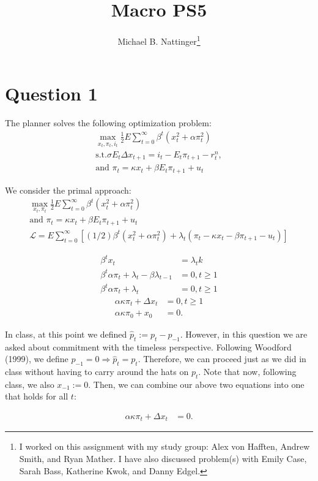 \documentclass[11pt]{article} %
\title{Macro PS5}
\author{Michael B. Nattinger\footnote{I worked on this assignment with my study group: Alex von Hafften, Andrew Smith, and Ryan Mather. I have also discussed problem(s) with Emily Case, Sarah Bass, Katherine Kwok, and Danny Edgel.}}
\begin{document}
\maketitle
\section{Question 1}
The planner solves the following optimization problem:
\begin{align*}
\max_{x_t,\pi_t,i_t} \frac{1}{2}E\sum_{t=0}^{\infty}\beta^t (x_t^2 + \alpha \pi_t^2) \\
\text{s.t.} \sigma E_t\Delta x_{t+1} = i_t - E_t\pi_{t+1} - r_t^n,\\
\text{and } \pi_t = \kappa x_t + \beta E_t\pi_{t+1} + u_t
\end{align*}

We consider the primal approach:
\begin{align*}
\max_{x_t,\pi_t} \frac{1}{2}E\sum_{t=0}^{\infty}\beta^t (x_t^2 + \alpha \pi_t^2) \\
\text{and } \pi_t = \kappa x_t + \beta E_t\pi_{t+1} + u_t\\
\mathcal{L} = E\sum_{t=0}^{\infty}\left[(1/2)\beta^t (x_t^2 + \alpha \pi_t^2) + \lambda_t(\pi_t - \kappa x_t - \beta \pi_{t+1} - u_t) \right]
\end{align*}

\begin{align*}
\beta^t x_t &= \lambda_t k\\
\beta^t\alpha\pi_t + \lambda_t - \beta \lambda_{t-1} &= 0, t\geq 1\\
\beta^t\alpha\pi_t + \lambda_t &= 0, t\geq 1
\end{align*}
\begin{align*}
\alpha \kappa \pi_t + \Delta x_t &= 0, t\geq 1\\
\alpha \kappa \pi_0 + x_0 &= 0.
\end{align*}

In class, at this point we defined $\hat{p}_t := p_t - p_{-1}$. However, in this question we are asked about commitment with the timeless perspective. Following Woodford (1999), we define $p_{-1} = 0 \Rightarrow \hat{p}_t = p_t.$ Therefore, we can proceed just as we did in class without having to carry around the hats on $p_t$. Note that now, following class, we also $x_{-1}:=0$. Then, we can combine our above two equations into one that holds for all $t$:

\begin{align*}
\alpha \kappa \pi_t + \Delta x_t &= 0.
\end{align*}
\end{document}

